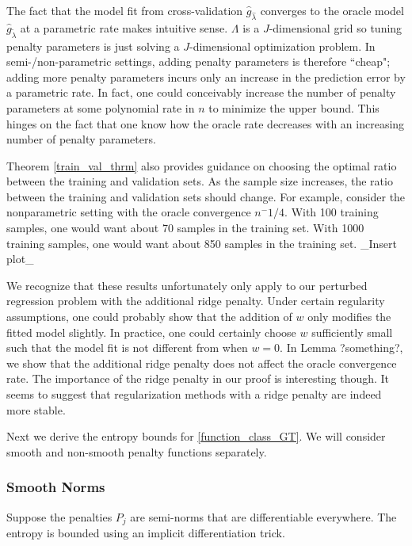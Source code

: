 \documentclass[12pt]{article}
\begin{document}
The fact that the model fit from cross-validation $\hat{g}_{\hat{\lambda}}$ converges to the oracle model $\hat{g}_{\tilde{\lambda}}$ at a parametric rate makes intuitive sense. $\Lambda$ is a $J$-dimensional grid so tuning penalty parameters is just solving a $J$-dimensional optimization problem. In semi-/non-parametric settings, adding penalty parameters is therefore ``cheap"; adding more penalty parameters incurs only an increase in the prediction error by a parametric rate. 
In fact, one could conceivably increase the number of penalty parameters at some polynomial rate in $n$ to minimize the upper bound. This hinges on the fact that one know how the oracle rate decreases with an increasing number of penalty parameters.

Theorem \ref{train_val_thrm} also provides guidance on choosing the optimal ratio between the training and validation sets. As the sample size increases, the ratio between the training and validation sets should change. For example, consider the nonparametric setting with the oracle convergence $n^-1/4$. With 100 training samples, one would want about 70 samples in the training set. With 1000 training samples, one would want about 850 samples in the training set. \_Insert plot\_

We recognize that these results unfortunately only apply to our perturbed regression problem with the additional ridge penalty. Under certain regularity assumptions, one could probably show that the addition of $w$ only modifies the fitted model slightly. In practice, one could certainly choose $w$ sufficiently small such that the model fit is not different from when $w = 0$.  In Lemma ?something?, we show that the additional ridge penalty does not affect the oracle convergence rate. The importance of the ridge penalty in our proof is interesting though. It seems to suggest that regularization methods with a ridge penalty are indeed more stable.

Next we derive the entropy bounds for \eqref{function_class_GT}. We will consider smooth and non-smooth penalty functions separately.

\subsubsection{Smooth Norms}
Suppose the penalties $P_j$ are semi-norms that are differentiable everywhere. The entropy is bounded using an implicit differentiation trick.
\end{document}
